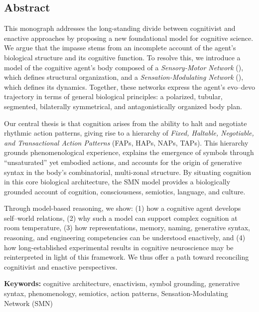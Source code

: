 
\subsection*{Abstract}
This monograph addresses the long-standing divide between cognitivist and enactive approaches by proposing a new foundational model for cognitive science. We argue that the impasse stems from an incomplete account of the agent’s biological structure and its cognitive function. To resolve this, we introduce a model of the cognitive agent’s body composed of a \emph{Sensory-Motor Network} (\SMNS), which defines structural organization, and a \emph{Sensation-Modulating Network} (\SMND), which defines its dynamics. Together, these networks express the agent’s evo–devo trajectory in terms of general biological principles: a polarized, tubular, segmented, bilaterally symmetrical, and antagonistically organized body plan. 

Our central thesis is that cognition arises from the ability to halt and negotiate rhythmic action patterns, giving rise to a hierarchy of \emph{Fixed, Haltable, Negotiable, and Transactional Action Patterns} (FAPs, HAPs, NAPs, TAPs). This hierarchy grounds phenomenological experience, explains the emergence of symbols through “unsaturated” yet embodied actions, and accounts for the origin of generative syntax in the body’s combinatorial, multi-zonal structure. By situating cognition in this core biological architecture, the SMN model provides a biologically grounded account of cognition, consciousness, semiotics, language, and culture. 

Through model-based reasoning, we show: (1) how a cognitive agent develops self–world relations, (2) why such a model can support complex cognition at room temperature, (3) how representations, memory, naming, generative syntax, reasoning, and engineering competencies can be understood enactively, and (4) how long-established experimental results in cognitive neuroscience may be reinterpreted in light of this framework. We thus offer a path toward reconciling cognitivist and enactive perspectives.  

\bigskip
\noindent \textbf{Keywords:} cognitive architecture, enactivism, symbol grounding, generative syntax, phenomenology, semiotics, action patterns, Sensation-Modulating Network (SMN)
